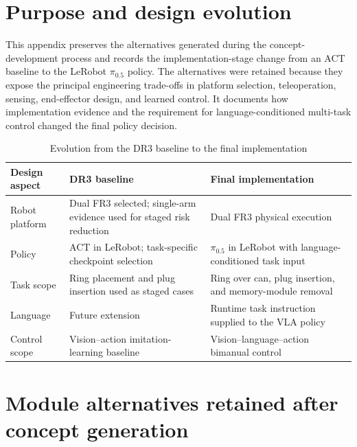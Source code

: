 
\label{chap:generated-concepts}

\section*{Purpose and design evolution}

This appendix preserves the alternatives generated during the concept-development process and records the implementation-stage change from an ACT baseline to the LeRobot $\pi_{0.5}$ policy. The alternatives were retained because they expose the principal engineering trade-offs in platform selection, teleoperation, sensing, end-effector design, and learned control. It documents how implementation evidence and the requirement for language-conditioned multi-task control changed the final policy decision.

\begin{table}[!htbp]
\centering
\caption{Evolution from the DR3 baseline to the final implementation}
\label{tab:design-evolution}
\small
\begin{tabularx}{\textwidth}{p{}XX}
\toprule
\textbf{Design aspect} & \textbf{DR3 baseline} & \textbf{Final implementation} \\
\midrule
Robot platform & Dual FR3 selected; single-arm evidence used for staged risk reduction & Dual FR3 physical execution \\
Policy & ACT in LeRobot; task-specific checkpoint selection & $\pi_{0.5}$ in LeRobot with language-conditioned task input \\
Task scope & Ring placement and plug insertion used as staged cases & Ring over can, plug insertion, and memory-module removal \\
Language & Future extension & Runtime task instruction supplied to the VLA policy \\
Control scope & Vision--action imitation-learning baseline & Vision--language--action bimanual control \\
\bottomrule
\end{tabularx}
\end{table}

\section*{Module alternatives retained after concept generation}

